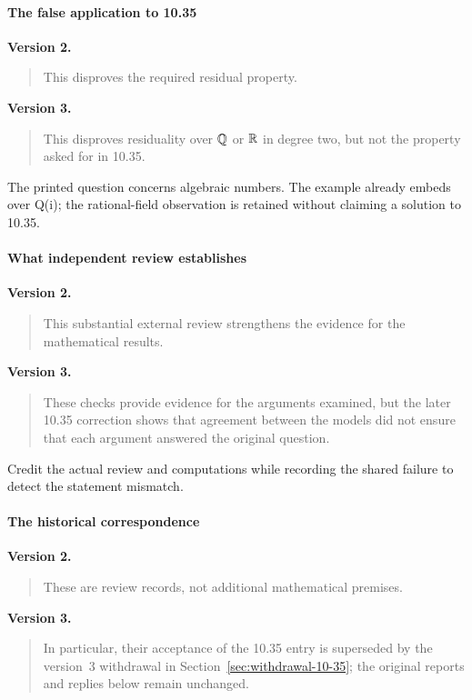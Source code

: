 \paragraph{The false application to 10.35}

\noindent\textbf{Version 2.}
\begin{quote}\small
This disproves the required residual property.
\end{quote}

\noindent\textbf{Version 3.}
\begin{quote}\small
This disproves residuality over \(\mathbb Q\) or \(\mathbb R\)
in degree two, but not the property asked for in 10.35.
\end{quote}

The printed question concerns algebraic numbers. The example already embeds over Q(i); the rational-field observation is retained without claiming a solution to 10.35.

\paragraph{What independent review establishes}

\noindent\textbf{Version 2.}
\begin{quote}\small
This substantial external review strengthens the evidence for the
mathematical results.
\end{quote}

\noindent\textbf{Version 3.}
\begin{quote}\small
These checks provide evidence for the arguments examined, but the later
10.35 correction shows that agreement between the models did not ensure
that each argument answered the original question.
\end{quote}

Credit the actual review and computations while recording the shared failure to detect the statement mismatch.

\paragraph{The historical correspondence}

\noindent\textbf{Version 2.}
\begin{quote}\small
These are review records, not additional mathematical premises.
\end{quote}

\noindent\textbf{Version 3.}
\begin{quote}\small
In particular, their acceptance of the 10.35 entry is superseded by
the version~3 withdrawal in Section~\ref{sec:withdrawal-10-35}; the
original reports and replies below remain unchanged.
\end{quote}

